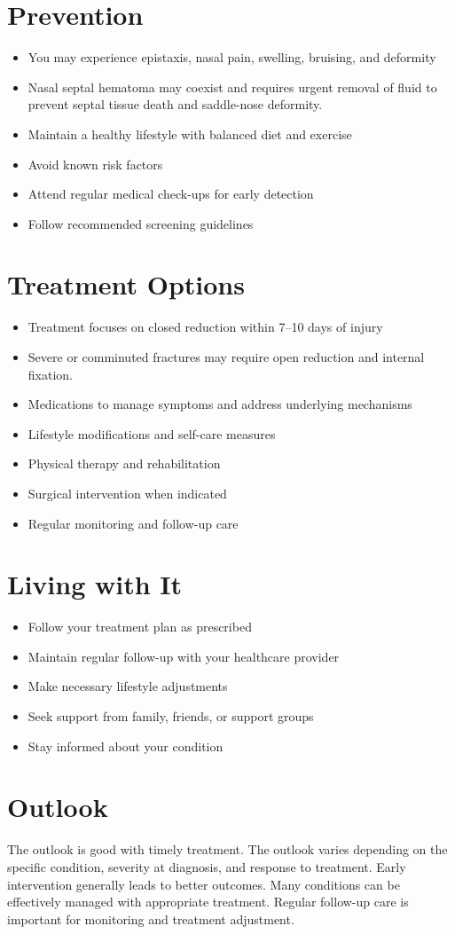 \section{Prevention}
\begin{itemize}[noitemsep]
  \item You may experience epistaxis, nasal pain, swelling, bruising, and deformity
  \item Nasal septal hematoma may coexist and requires urgent removal of fluid to prevent septal tissue death and saddle-nose deformity.
  \item Maintain a healthy lifestyle with balanced diet and exercise
  \item Avoid known risk factors
  \item Attend regular medical check-ups for early detection
  \item Follow recommended screening guidelines
\end{itemize}
\section{Treatment Options}
\begin{itemize}[noitemsep]
  \item Treatment focuses on closed reduction within 7--10 days of injury
  \item Severe or comminuted fractures may require open reduction and internal fixation.
  \item Medications to manage symptoms and address underlying mechanisms
  \item Lifestyle modifications and self-care measures
  \item Physical therapy and rehabilitation
  \item Surgical intervention when indicated
  \item Regular monitoring and follow-up care
\end{itemize}
\section{Living with It}
\begin{itemize}[noitemsep]
  \item Follow your treatment plan as prescribed
  \item Maintain regular follow-up with your healthcare provider
  \item Make necessary lifestyle adjustments
  \item Seek support from family, friends, or support groups
  \item Stay informed about your condition
\end{itemize}
\section{Outlook}
The outlook is good with timely treatment. The outlook varies depending on the specific condition, severity at diagnosis, and response to treatment. Early intervention generally leads to better outcomes. Many conditions can be effectively managed with appropriate treatment. Regular follow-up care is important for monitoring and treatment adjustment.
